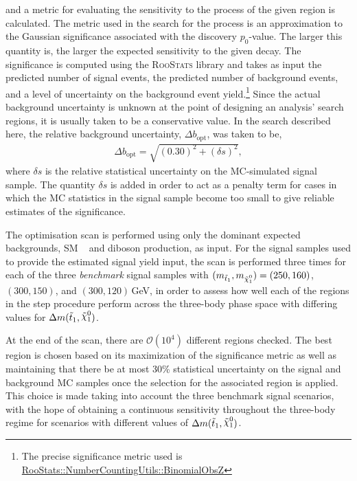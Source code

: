 and a metric for evaluating the sensitivity to the \bWN process of the given region
is calculated.
The metric used in the search for the \bWN process is an approximation to the Gaussian significance
associated with the discovery $p_0$-value.
The larger this quantity is, the larger the expected sensitivity to the given \bWN decay.
The significance is computed using the \textsc{RooStats} library and takes as input
the predicted number of signal events, the predicted number of background events,
and a level of uncertainty on the background event yield.\footnote{The precise
significance metric used is \href{https://root.cern.ch/doc/v606/namespaceRooStats_1_1NumberCountingUtils.html\#a4ac05df7796855dca2d8b24473bf7d4e}{RooStats::NumberCountingUtils::BinomialObsZ} 
}
Since the actual background uncertainty is unknown at the point of designing an analysis'
search regions, it is usually taken to be a conservative value.
In the search described here, the relative background uncertainty, $\Delta b_{\text{opt}}$, was taken to be,
\begin{align*}
    \Delta b_{\text{opt}} = \sqrt{ (0.30)^2 + (\delta s)^2 },
\end{align*}
where $\delta s$ is the relative statistical uncertainty on the MC-simulated signal sample.
The quantity $\delta s$ is added in order to act as a penalty term for cases in which the
MC statistics in the signal sample become too small to give reliable estimates of the significance.

The optimisation scan is performed using only the dominant expected backgrounds, SM \ttbar~ and diboson production,
as input.
For the signal samples used to provide the estimated signal yield input,
the scan is performed three times for each of the three \textit{benchmark} signal samples with $\msn = (250, 160)$, $(300,150)$, and $(300,120)$\,GeV,
in order to assess how well each of the regions in the step procedure perform
across the three-body phase space with differing values for $\sdiff$.

At the end of the scan, there are $\mathcal{O}(10^4)$ different regions checked.
The best region is chosen based on its maximization of the significance metric as well as
maintaining that there be at most 30\% statistical uncertainty on the signal and background MC samples
once the selection for the associated region is applied.
This choice is made taking into account the three benchmark \bWN signal scenarios, with the hope
of obtaining a continuous sensitivity throughout the three-body regime for scenarios
with different values of $\sdiff$.

